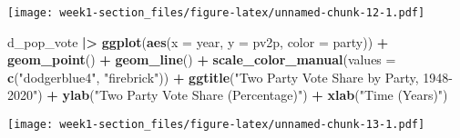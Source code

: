 \documentclass[
]{article}
\newenvironment{Shaded}{\begin{snugshade}}{\end{snugshade}}
\newcommand{\AttributeTok}[1]{\textcolor[rgb]{0.13,0.29,0.53}{#1}}
\newcommand{\FunctionTok}[1]{\textcolor[rgb]{0.13,0.29,0.53}{\textbf{#1}}}
\newcommand{\NormalTok}[1]{#1}
\newcommand{\SpecialCharTok}[1]{\textcolor[rgb]{0.81,0.36,0.00}{\textbf{#1}}}
\newcommand{\StringTok}[1]{\textcolor[rgb]{0.31,0.60,0.02}{#1}}
\begin{document}
\texttt{[image: week1-section\_files/figure-latex/unnamed-chunk-12-1.pdf]}

\begin{Shaded}
\begin{Highlighting}[]
\NormalTok{d\_pop\_vote }\SpecialCharTok{|\textgreater{}}
  \FunctionTok{ggplot}\NormalTok{(}\FunctionTok{aes}\NormalTok{(}\AttributeTok{x =}\NormalTok{ year, }\AttributeTok{y =}\NormalTok{ pv2p, }\AttributeTok{color =}\NormalTok{ party)) }\SpecialCharTok{+}
  \FunctionTok{geom\_point}\NormalTok{() }\SpecialCharTok{+}
  \FunctionTok{geom\_line}\NormalTok{() }\SpecialCharTok{+}
  \FunctionTok{scale\_color\_manual}\NormalTok{(}\AttributeTok{values =} \FunctionTok{c}\NormalTok{(}\StringTok{"dodgerblue4"}\NormalTok{, }\StringTok{"firebrick"}\NormalTok{)) }\SpecialCharTok{+}
  \FunctionTok{ggtitle}\NormalTok{(}\StringTok{"Two Party Vote Share by Party, 1948{-}2020"}\NormalTok{) }\SpecialCharTok{+}
  \FunctionTok{ylab}\NormalTok{(}\StringTok{"Two Party Vote Share (Percentage)"}\NormalTok{) }\SpecialCharTok{+}
  \FunctionTok{xlab}\NormalTok{(}\StringTok{"Time (Years)"}\NormalTok{)}
\end{Highlighting}
\end{Shaded}

\texttt{[image: week1-section\_files/figure-latex/unnamed-chunk-13-1.pdf]}
\end{document}
